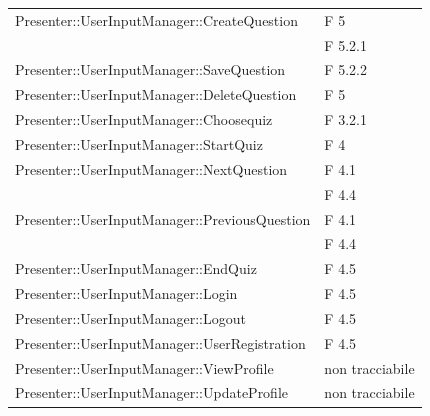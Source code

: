 \documentclass[a4paper,11pt]{article}
\begin{document}
\begin{longtable}{p{}p{}}
\midrule
Presenter::UserInputManager::CreateQuestion	& F 5\\
											& F 5.2.1\\
\midrule
Presenter::UserInputManager::SaveQuestion	& F 5.2.2\\

\midrule
Presenter::UserInputManager::DeleteQuestion	& F 5\\

\midrule
Presenter::UserInputManager::Choosequiz		& F 3.2.1\\

\midrule
Presenter::UserInputManager::StartQuiz		& F 4\\
\midrule
Presenter::UserInputManager::NextQuestion	& F 4.1\\
											& F 4.4\\
				
\midrule
Presenter::UserInputManager::PreviousQuestion		& F 4.1\\
													& F 4.4\\
\midrule
Presenter::UserInputManager::EndQuiz		& F 4.5\\
\midrule
Presenter::UserInputManager::Login		& F 4.5\\
\midrule
Presenter::UserInputManager::Logout		& F 4.5\\
\midrule
Presenter::UserInputManager::UserRegistration		& F 4.5\\
\midrule
Presenter::UserInputManager::ViewProfile	& non tracciabile\\
\midrule
Presenter::UserInputManager::UpdateProfile	& non tracciabile\\


\end{longtable}
\end{document}
